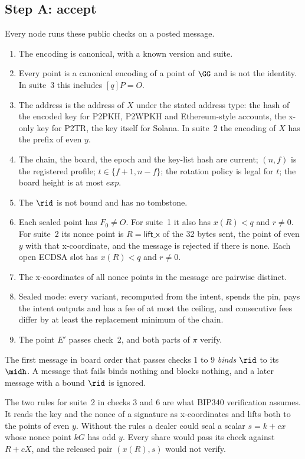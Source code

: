 \subsection{Step A: accept}\label{sec:stepa}

Every node runs these public checks on a posted message.

\begin{enumerate}[leftmargin=1.7em,itemsep=1pt]
\item The encoding is canonical, with a known version and suite.
\item Every point is a canonical encoding of a point of $\GG$ and is not the identity. In suite~3 this includes $[q]P = O$.
\item The address is the address of $X$ under the stated address type: the hash of the encoded key for P2PKH, P2WPKH and Ethereum-style accounts, the x-only key for P2TR, the key itself for Solana. In suite~2 the encoding of $X$ has the prefix of even $y$.
\item The chain, the board, the epoch and the key-list hash are current; $(n,f)$ is the registered profile; $t \in \{f+1, n-f\}$; the rotation policy is legal for $t$; the board height is at most $exp$.
\item The $\rid$ is not bound and has no tombstone.
\item Each sealed point has $F_0 \neq O$. For suite~1 it also has $x(R) < q$ and $r \neq 0$. For suite~2 its nonce point is $R = \mathsf{lift\_x}$ of the 32 bytes sent, the point of even $y$ with that x-coordinate, and the message is rejected if there is none. Each open ECDSA slot has $x(R) < q$ and $r \neq 0$.
\item The x-coordinates of all nonce points in the message are pairwise distinct.
\item Sealed mode: every variant, recomputed from the intent, spends the pin, pays the intent outputs and has a fee of at most the ceiling, and consecutive fees differ by at least the replacement minimum of the chain.
\item The point $E'$ passes check~2, and both parts of $\pi$ verify.
\end{enumerate}

The first message in board order that passes checks 1 to 9 \emph{binds} $\rid$ to its $\midh$. A message that fails binds nothing and blocks nothing, and a later message with a bound $\rid$ is ignored.

The two rules for suite~2 in checks 3 and 6 are what BIP340 verification assumes. It reads the key and the nonce of a signature as x-coordinates and lifts both to the points of even $y$. Without the rules a dealer could seal a scalar $s = k + cx$ whose nonce point $kG$ has odd $y$. Every share would pass its check against $R + cX$, and the released pair $(x(R), s)$ would not verify.

